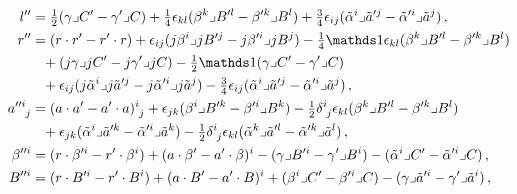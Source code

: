\documentclass[debug]{phd}
\begin{document}
					\begin{equation}\label{eq:ad-ad-IIB}
						\begin{split}
							l^{\prime\prime} 								& =\tfrac{1}{2}(\gamma\lrcorner C^{\prime}-\gamma^{\prime}\lrcorner C)+\tfrac{1}{4}\epsilon_{kl}(\beta^{k}\lrcorner B^{\prime l}-\beta^{\prime k}\lrcorner B^{l})+\tfrac{3}{4}\epsilon_{ij}(\tilde{\alpha}^{i}\lrcorner\tilde{a}^{\prime j}-\tilde{\alpha}^{\prime i}\lrcorner\tilde{a}^{j})\, ,\\
							r^{\prime\prime} 						& =(r\cdot r^{\prime}-r^{\prime}\cdot r)+\epsilon_{ij}(j\beta^{i}\lrcorner jB^{\prime j}-j\beta^{\prime i}\lrcorner jB^{j})-\tfrac{1}{4}\id\epsilon_{kl}(\beta^{k}\lrcorner B^{\prime l}-\beta^{\prime k}\lrcorner B^{l})\\
 											& \phantom{=} +(j\gamma\lrcorner jC^{\prime}-j\gamma^{\prime}\lrcorner jC)-\tfrac{1}{2}\id(\gamma\lrcorner C^{\prime}-\gamma^{\prime}\lrcorner C)\\
 											& \phantom{=} +\epsilon_{ij}(j\tilde{\alpha}^{i}\lrcorner j\tilde{a}^{\prime j}-j\tilde{\alpha}^{\prime i}\lrcorner j\tilde{a}^{j})-\tfrac{3}{4}\epsilon_{ij}(\tilde{\alpha}^{i}\lrcorner\tilde{a}^{\prime j}-\tilde{\alpha}^{\prime i}\lrcorner\tilde{a}^{j})\, ,\\
							a_{\phantom{\prime\prime i}j}^{\prime\prime i} 	& =(a\cdot a^{\prime}-a^{\prime}\cdot a)_{\phantom{i}j}^{i}+\epsilon_{jk}(\beta^{i}\lrcorner B^{\prime k}-\beta^{\prime i}\lrcorner B^{k})-\tfrac{1}{2}\delta_{\phantom{i}j}^{i}\epsilon_{kl}(\beta^{k}\lrcorner B^{\prime l}-\beta^{\prime k}\lrcorner B^{l})\\
											& \phantom{=} +\epsilon_{jk}(\tilde{\alpha}^{i}\lrcorner\tilde{a}^{\prime k}-\tilde{\alpha}^{\prime i}\lrcorner\tilde{a}^{k})-\tfrac{1}{2}\delta_{\phantom{i}j}^{i}\epsilon_{kl}(\tilde{\alpha}^{k}\lrcorner\tilde{a}^{\prime l}-\tilde{\alpha}^{\prime k}\lrcorner\tilde{a}^{l})\, ,\\
							\beta^{\prime\prime i} 					& =(r\cdot\beta^{\prime i}-r^{\prime}\cdot\beta^{i})+(a\cdot\beta^{\prime}-a^{\prime}\cdot\beta)^{i}-(\gamma\lrcorner B^{\prime i}-\gamma^{\prime}\lrcorner B^{i})-(\tilde{\alpha}^{i}\lrcorner C^{\prime}-\tilde{\alpha}^{\prime i}\lrcorner C)\, ,\\
							B^{\prime\prime i} 						& =(r\cdot B^{\prime i}-r^{\prime}\cdot B^{i})+(a\cdot B^{\prime}-a^{\prime}\cdot B)^{i}+(\beta^{i}\lrcorner C^{\prime}-\beta^{\prime i}\lrcorner C)-(\gamma\lrcorner\tilde{a}^{\prime i}-\gamma^{\prime}\lrcorner\tilde{a}^{i})\, ,\\

\end{split}
\end{equation}
\end{document}

